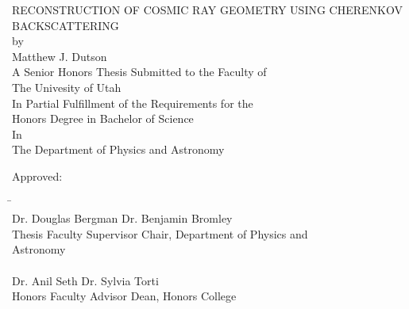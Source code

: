 \vspace*{\fill}
\begin{center}

RECONSTRUCTION OF COSMIC RAY GEOMETRY USING CHERENKOV BACKSCATTERING \\[4\baselineskip]

by                 \\[\baselineskip]
Matthew J. Dutson  \\[4\baselineskip]

A Senior Honors Thesis Submitted to the Faculty of \\
The Univesity of Utah                              \\
In Partial Fulfillment of the Requirements for the \\[\baselineskip]
Honors Degree in Bachelor of Science               \\[3\baselineskip]

In                                      \\[\baselineskip]
The Department of Physics and Astronomy \\[2\baselineskip]

\end{center}
Approved: \\[2\baselineskip]

\begin{tabbing}
\hspace*{8cm}             \=    \kill
\underline{\hspace{6cm}}  \>    \underline{\hspace{6cm}}         \\
Dr. Douglas Bergman       \>    Dr. Benjamin Bromley             \\
Thesis Faculty Supervisor \>    Chair, Department of Physics and \\
                          \>    Astronomy                        \\[3\baselineskip]
\underline{\hspace{6cm}}  \>    \underline{\hspace{6cm}}         \\
Dr. Anil Seth             \>    Dr. Sylvia Torti                 \\
Honors Faculty Advisor    \>    Dean, Honors College             \\
\end{tabbing}

\vspace*{\fill}